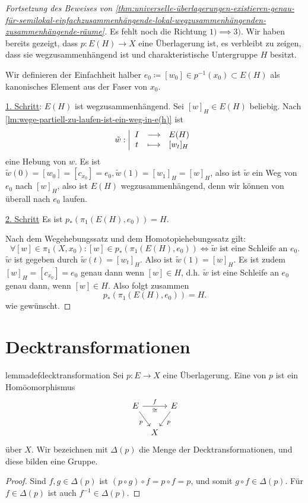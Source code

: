 \begin{proof}[Fortsetzung des Beweises von \autoref{thm:universelle-überlagerungen-existieren-genau-für-semilokal-einfachzusammenhängende-lokal-wegzusammenhängenden-zusammenhängende-räume}]
    Es fehlt noch die Richtung $1) \implies 3)$.  Wir haben bereits gezeigt, dass $p\colon  E(H) \to  X$ eine Überlagerung ist, es verbleibt zu zeigen, dass sie wegzusammenhängend ist und charakteristische Untergruppe $H$ besitzt.

    Wir definieren der Einfachheit halber $e_0\coloneqq [w_{0}]\in p^{-1} (x_0) \subset E(H)$ als kanonisches Element aus der Faser von $x_0$.

    \underline{1. Schritt}: $E(H)$ ist wegzusammenhängend. Sei  $[w]_H \in E(H)$ beliebig. Nach \autoref{lm:wege-partiell-zu-laufen-ist-ein-weg-in-e(h)} ist
        \begin{equation*}
        \tilde{w}: \left| \begin{array}{c c l} 
            I & \longrightarrow & E(H) \\
            t & \longmapsto &  [w_t]_H
        \end{array} \right.
    \end{equation*}
    eine Hebung von $w$. Es ist  $\tilde{w}(0) = [w_0] = [c_{x_0}] = e_0, \tilde{w}(1) = [w_1]_H = [w]_H$, also ist $\tilde{w}$ ein Weg von $e_0$ nach $[w]_H$, also ist  $E(H)$ wegzusammenhängend, denn wir können von überall nach  $e_0$ laufen.

    \underline{2. Schritt} Es ist $p_*(\pi_1(E(H),e_0)) = H$.

    Nach dem Wegehebungssatz und dem Homotopiehebungssatz gilt:
    \[
        \forall [w] \in \pi_1(X,x_0) \colon  [w] \in p_*(\pi_1(E(H),e_0)) \iff  \tilde{w} \text{ ist eine Schleife an $e_0$}
    .\] 
    $\tilde{w}$ ist gegeben durch  $\tilde{w}(t) = [w_t]_H$. Also ist $\tilde{w}(1) = [w]_H$. Es ist zudem $[w]_H = [c_{x_0}] = e_0$ genau dann wenn $[w]\in H$, d.h. $\tilde{w}$ ist eine Schleife an $e_0$ genau dann, wenn $[w] \in H$. Also folgt zusammen
    \[
        p_*(\pi_1(E(H),e_0)) = H
    .\] 
    wie gewünscht.
\end{proof}

\section{Decktransformationen}
\begin{restatable}[Decktransformation]{lemmadef}{decktransformation}\label{def:decktransformation}
    Sei $p\colon  E \to  X$ eine Überlagerung. Eine  von $p$ ist ein Homöomorphismus
     \[
    \begin{tikzcd}[column sep = tiny]
        E \ar{rr}{f}[swap]{\cong} \ar[swap]{dr}{p} & & E \ar{dl}{p} \\
    & X
    \end{tikzcd}
    \]
    über $X$.  Wir bezeichnen mit  $\Delta(p)$ die Menge der Decktransformationen, und diese bilden eine Gruppe.
\end{restatable}

\begin{proof}
    Sind $f,g\in \Delta(p)$ ist $(p \circ  g) \circ  f = p \circ  f = p$, und somit $g \circ  f \in \Delta(p)$. Für $f\in \Delta(p)$ ist auch $f^{-1}\in \Delta(p)$.
\end{proof}
